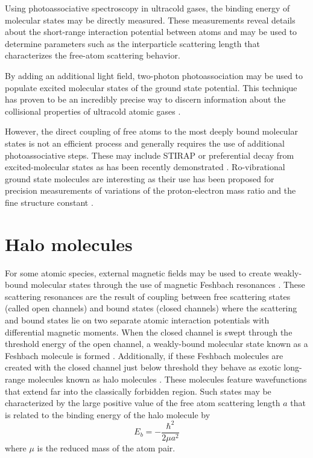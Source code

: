 Using photoassociative spectroscopy in ultracold gases, the binding energy of molecular states may be directly measured.
These measurements reveal details about the short-range interaction potential between atoms and may be used to determine parameters such as the interparticle scattering length that characterizes the free-atom scattering behavior.

By adding an additional light field, two-photon photoassociation may be used to populate excited molecular states of the ground state potential.
This technique has proven to be an incredibly precise way to discern information about the collisional properties of ultracold atomic gases \cite{MartinezDeEscobar2008, Aman2018}.

However, the direct coupling of free atoms to the most deeply bound molecular states is not an efficient process and generally requires the use of additional photoassociative steps.
These may include STIRAP or preferential decay from excited-molecular states as has been recently demonstrated \cite{Reinaudi2012, cbc17, Stellmer2012, Ciamei2017}.
Ro-vibrational ground state molecules are interesting as their use has been proposed for precision measurements of variations of the proton-electron mass ratio \cite{zky08, Kotochigova2009} and the fine structure constant \cite{Beloy2011}. 


\section{Halo molecules} \label{sec:halo}
For some atomic species, external magnetic fields may be used to create weakly-bound molecular states through the use of magnetic Feshbach resonances \cite{Kohler2006, Chin2010}.
These scattering resonances are the result of coupling between free scattering states (called open channels) and bound states (closed channels) where the scattering and bound states lie on two separate atomic interaction potentials with differential magnetic moments.
When the closed channel is swept through the threshold energy of the open channel, a weakly-bound molecular state known as a Feshbach molecule is formed \cite{cbk03, grj03,hkm03,rtb03,sph03}.
Additionally, if these Feshbach molecules are created with the closed channel just below threshold they behave as exotic long-range molecules known as halo molecules \cite{Kohler2006}.
These molecules feature wavefunctions that extend far into the classically forbidden region.
Such states may be characterized by the large positive value of the free atom scattering length $a$ that is related to the binding energy of the halo molecule by
\begin{equation}
	E_b = -\frac{\hbar^2}{2 \mu a^2}
\end{equation}
where $\mu$ is the reduced mass of the atom pair.

